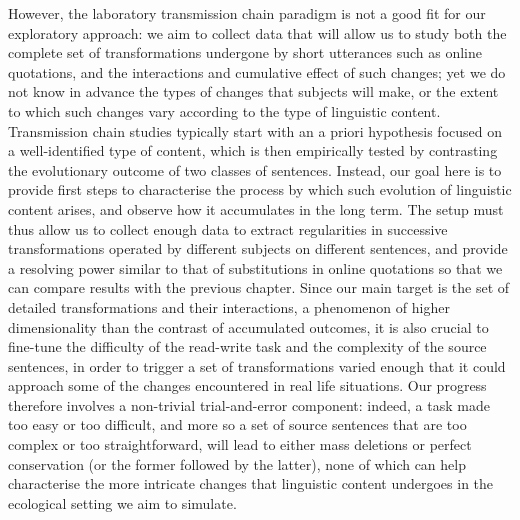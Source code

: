 However, the laboratory transmission chain paradigm is not a good fit
for our exploratory approach: we aim to collect data that will allow us
to study both the complete set of transformations undergone by short
utterances such as online quotations, and the interactions and
cumulative effect of such changes; yet we do not know in advance the
types of changes that subjects will make, or the extent to which such
changes vary according to the type of linguistic content. Transmission
chain studies typically start with an a priori hypothesis focused on a
well-identified type of content, which is then empirically tested by
contrasting the evolutionary outcome of two classes of sentences.
Instead, our goal here is to provide first steps to characterise the
process by which such evolution of linguistic content arises, and
observe how it accumulates in the long term. The setup must thus allow
us to collect enough data to extract regularities in successive
transformations operated by different subjects on different sentences,
and provide a resolving power similar to that of substitutions in online
quotations so that we can compare results with the previous chapter.
Since our main target is the set of detailed transformations and their
interactions, a phenomenon of higher dimensionality than the contrast of
accumulated outcomes, it is also crucial to fine-tune the difficulty of
the read-write task and the complexity of the source sentences, in order
to trigger a set of transformations varied enough that it could approach
some of the changes encountered in real life situations. Our progress
therefore involves a non-trivial trial-and-error component: indeed, a
task made too easy or too difficult, and more so a set of source
sentences that are too complex or too straightforward, will lead to
either mass deletions or perfect conservation (or the former followed by
the latter), none of which can help characterise the more intricate
changes that linguistic content undergoes in the ecological setting we
aim to simulate.

